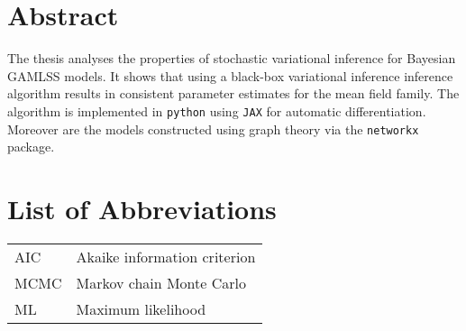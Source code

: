
\section*{Abstract}
The thesis analyses the properties of stochastic variational inference for Bayesian GAMLSS models.
It shows that using a black-box variational inference inference algorithm results in
consistent parameter estimates for the mean field family. The algorithm is implemented in \verb|python|
using \verb|JAX| for automatic differentiation. Moreover are the models constructed using graph theory via
the \verb|networkx| package.

\clearpage

\tableofcontents
\clearpage

\listoffigures

\listoftables

\section*{List of Abbreviations}

\begin{tabular}{@{} l @{\hskip 1in} l}
  AIC & Akaike information criterion \\
  MCMC & Markov chain Monte Carlo \\
  ML & Maximum likelihood \\
\end{tabular}
